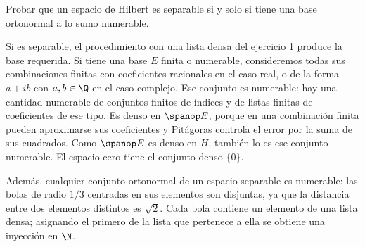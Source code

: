\begin{ejercicio}
Probar que un espacio de Hilbert es separable si y solo si tiene una base ortonormal a lo sumo numerable.
\end{ejercicio}
\begin{solucion}
Si es separable, el procedimiento con una lista densa del ejercicio 1 produce la base requerida. Si tiene una base $E$ finita o numerable, consideremos todas sus combinaciones finitas con coeficientes racionales en el caso real, o de la forma $a+ib$ con $a,b\in\Q$ en el caso complejo. Ese conjunto es numerable: hay una cantidad numerable de conjuntos finitos de índices y de listas finitas de coeficientes de ese tipo. Es denso en $\spanop E$, porque en una combinación finita pueden aproximarse sus coeficientes y Pitágoras controla el error por la suma de sus cuadrados. Como $\spanop E$ es denso en $H$, también lo es ese conjunto numerable. El espacio cero tiene el conjunto denso $\{0\}$.

Además, cualquier conjunto ortonormal de un espacio separable es numerable: las bolas de radio $1/3$ centradas en sus elementos son disjuntas, ya que la distancia entre dos elementos distintos es $\sqrt2$. Cada bola contiene un elemento de una lista densa; asignando el primero de la lista que pertenece a ella se obtiene una inyección en $\N$.
\end{solucion}


